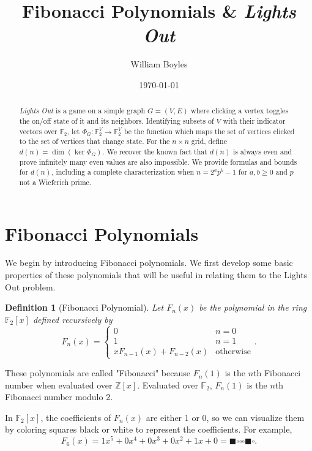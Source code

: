\documentclass[a4paper]{article}
\newtheorem{definition}[theorem]{Definition}
\newcommand{\F}{\mathbb{F}}
\newcommand{\Z}{\mathbb{Z}}
\renewcommand{\dim}[1]{\operatorname{dim}\!\left( #1 \right)}
\begin{document}
    \title{Fibonacci Polynomials \& \textit{Lights Out}}
    \author{William Boyles}
    \date{\today}
    \maketitle
	
    \begin{abstract}
    	\textit{Lights Out} is a game on a simple graph $G = (V,E)$ where clicking a vertex toggles the on/off state of it and its neighbors.
	    Identifying subsets of $V$ with their indicator vectors over $\F_2$, let $\Phi_G: \F_2^V \rightarrow \F_2^V$ be the function which maps the set of vertices clicked to the set of vertices that change state.
	    For the $n \times n$ grid, define $d(n) = \dim{\ker{\Phi_G}}$.
	    We recover the known fact that $d(n)$ is always even and prove infinitely many even values are also impossible.
	    We provide formulas and bounds for $d(n)$, including a complete characterization when $n = 2^{a}p^{b} - 1$ for $a, b \geq 0$ and $p$ not a Wieferich prime.
	\end{abstract}

	\section{Fibonacci Polynomials}
	We begin by introducing Fibonacci polynomials.
	We first develop some basic properties of these polynomials that will be useful in relating them to the Lights Out problem.
	
	\begin{definition}[Fibonacci Polynomial]
		Let $F_n(x)$ be the polynomial in the ring $\F_2[x]$ defined recursively by
		\begin{equation*}
			F_n(x) = \begin{cases}
				0 & n=0 \\
				1 & n=1 \\
				xF_{n-1}(x) + F_{n-2}(x) & \text{otherwise}
			\end{cases}.
		\end{equation*}
	\end{definition}
	These polynomials are called "Fibonacci" because $F_n(1)$ is the $n$th Fibonacci number when evaluated over $\Z[x]$.
	Evaluated over $\F_2$, $F_n(1)$ is the $n$th Fibonacci number modulo 2.
	
	In $\F_2[x]$, the coefficients of $F_n(x)$ are either 1 or 0, so we can visualize them by coloring squares black or white to represent the coefficients.
	For example,
	\begin{equation*}
		F_6(x) = 1x^5 + 0x^4 + 0x^3 + 0x^2 + 1x + 0 = \blacksquare \square \square \square \blacksquare \square.
	\end{equation*}
\end{document}
